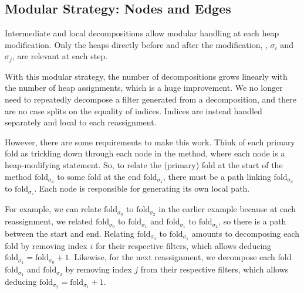 \documentclass[msc,oneside]{ubcthesis}
\begin{document}
\subsection{Modular Strategy: Nodes and Edges}
Intermediate and local decompositions allow modular handling at each heap modification. Only the heaps directly before and after the modification, \ie, $\sigma_i$ and $\sigma_j$, are relevant at each step.

With this modular strategy, the number of decompositions grows linearly with the number of heap assignments, which is a huge improvement. We no longer need to repeatedly decompose a filter generated from a decomposition, and there are no case splits on the equality of indices. Indices are instead handled separately and local to each reassignment.

However, there are some requirements to make this work. Think of each primary fold as trickling down through each node in the method, where each node is a heap-modifying statement. So, to relate the (primary) fold at the start of the method $\textrm{fold}_{\sigma_a}$ to some fold at the end $\textrm{fold}_{\sigma_z}$, there must be a path linking $\textrm{fold}_{\sigma_a}$ to $\textrm{fold}_{\sigma_z}$. Each node is responsible for generating its own local path.

For example, we can relate $\textrm{fold}_{\sigma_0}$ to $\textrm{fold}_{\sigma_2}$ in the earlier example because at each reassignment, we related $\textrm{fold}_{\sigma_0}$ to $\textrm{fold}_{\sigma_1}$ and $\textrm{fold}_{\sigma_1}$ to $\textrm{fold}_{\sigma_2}$, so there is a path between the start and end. Relating $\textrm{fold}_{\sigma_0}$ to $\textrm{fold}_{\sigma_1}$ amounts to decomposing each fold by removing index $i$ for their respective filters, which allows deducing $\textrm{fold}_{\sigma_1} = \textrm{fold}_{\sigma_0} + 1$. Likewise, for the next reassignment, we decompose each fold $\textrm{fold}_{\sigma_1}$ and $\textrm{fold}_{\sigma_2}$ by removing index $j$ from their respective filters, which allows deducing $\textrm{fold}_{\sigma_2} = \textrm{fold}_{\sigma_1} + 1$. 
\end{document}
